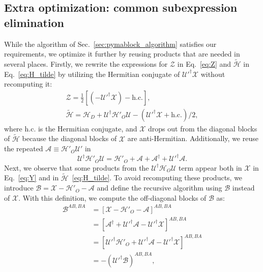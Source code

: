 \subsection{Extra optimization: common subexpression elimination}
While the algorithm of Sec.~\ref{sec:pymablock_algorithm} satisfies our requirements, we optimize it further by reusing products that are needed in several places.
Firstly, we rewrite the expressions for $\mathcal{Z}$ in Eq.~\eqref{eq:Z} and $\tilde{\mathcal{H}}$ in Eq.~\eqref{eq:H_tilde} by utilizing the Hermitian conjugate of $\mathcal{U}'^\dagger \mathcal{X}$ without recomputing it:
%
\begin{gather*}
\mathcal{Z} = \frac{1}{2}\left[(-\mathcal{U}'^\dagger \mathcal{X})- \textrm{h.c.}\right],\\
\tilde{\mathcal{H}} = \mathcal{H}_{D} + \mathcal{U}^\dagger \mathcal{H}'_{O} \mathcal{U} - (\mathcal{U}'^\dagger \mathcal{X} + \textrm{h.c.})/2,
\end{gather*}
%
where $\textrm{h.c.}$ is the Hermitian conjugate, and $\mathcal{X}$ drops out from the diagonal blocks of $\tilde{\mathcal{H}}$ because the diagonal blocks of $\mathcal{X}$ are anti-Hermitian.
%
Additionally, we reuse the repeated $\mathcal{A} \equiv \mathcal{H}'_{O}\mathcal{U}'$ in
%
\begin{equation}
\label{eq:UHU}
\mathcal{U}^\dagger \mathcal{H}'_{O} \mathcal{U} = \mathcal{H}'_{O} + \mathcal{A} + \mathcal{A}^\dagger + \mathcal{U}'^\dagger \mathcal{A}.
\end{equation}
%
Next, we observe that some products from the $\mathcal{U}^{\dagger} \mathcal{H}_{O}\mathcal{U}$ term appear both in $\mathcal{X}$ in Eq.~\eqref{eq:Y} and in $\tilde{\mathcal{H}}$~\eqref{eq:H_tilde}.
%
To avoid recomputing these products, we introduce $\mathcal{B} = \mathcal{X} - \mathcal{H}'_{O} - \mathcal{A}$ and define the recursive algorithm using $\mathcal{B}$ instead of $\mathcal{X}$.
%
With this definition, we compute the off-diagonal blocks of $\mathcal{B}$ as:
%
\begin{equation}
\label{eq:B_offdiag}
\begin{aligned}
  \mathcal{B}^{AB, BA} &= \left[\mathcal{X} - \mathcal{H}'_{O} - \mathcal{A} \right]^{AB, BA}\\
  &= \left[\mathcal{A}^\dagger + \mathcal{U}'^\dagger\mathcal{A} - \mathcal{U}'^\dagger \mathcal{X} \right]^{AB, BA}\\
  &= \left[\mathcal{U}'^\dagger\mathcal{H}'_{O} + \mathcal{U}'^\dagger\mathcal{A} - \mathcal{U}'^\dagger \mathcal{X} \right]^{AB, BA}\\
  &= -(\mathcal{U'}^\dagger \mathcal{B})^{AB, BA},
\end{aligned}
\end{equation}
